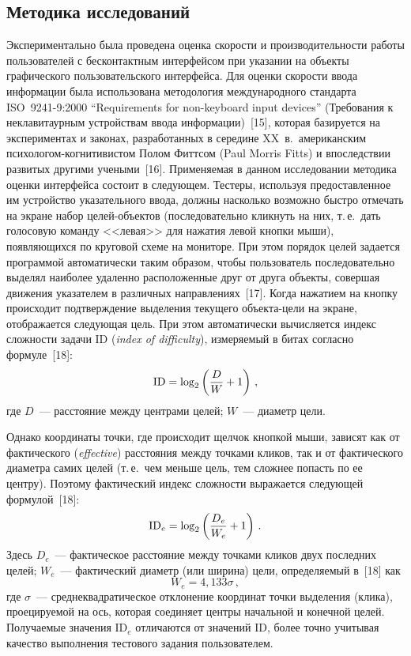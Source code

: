 \begin{multicols}{2}
\subsection{Методика исследований}

  Экспериментально была проведена оценка скорости и производительности 
работы пользователей с бесконтактным интерфейсом при указании на объекты 
графического пользовательского интерфейса. Для оценки скорости ввода 
информации была использована методология международного стандарта 
ISO~9241-9:2000 ``Requirements for non-keyboard input devices'' (Требования 
к неклавитаурным устройствам ввода информации)~[15], которая базируется на 
экспериментах и законах, разработанных в середине XX~в.\ американским 
пси\-хо\-ло\-гом-когни\-ти\-ви\-стом Полом Фиттсом (Paul Morris Fitts) и впоследствии 
развитых другими учеными~[16]. Применяемая в данном исследовании 
методика оценки интерфейса состоит в следующем. Тестеры, используя 
предоставленное им устройство указательного ввода, должны насколько 
возможно быстро отмечать на экране набор целей-объектов (последовательно 
кликнуть на них, т.\,е.\ дать голосовую команду <<левая>> для нажатия левой 
кнопки мыши), появляющихся по круговой схеме на мониторе. При этом 
порядок целей задается программой автоматически таким образом, чтобы 
пользователь последовательно выделял наиболее удаленно расположенные 
друг от друга объекты, совершая движения указателем в различных 
направлениях~[17]. Когда нажатием на кнопку происходит подтверждение 
выделения текущего объекта-цели на экране, отображается следующая цель. 
При этом автоматически вычисляется индекс сложности задачи ID
(\textit{index of difficulty}), измеряемый в битах согласно формуле~[18]:
  \begin{equation}
\mathrm{ID}=\log_2 \left( \displaystyle\frac{\displaystyle D\mathstrut}{\displaystyle W\mathstrut}+1\right)\,,
  \label{e1kar}
  \end{equation}
где $D$~--- расстояние между центрами целей; $W$~--- диаметр цели. 
  
  Однако координаты точки, где происходит щелчок кнопкой мыши, зависят 
как от фактического (\textit{effective}) расстояния между точками кликов, так и 
от фактического диаметра самих целей (т.\,е.\ чем меньше цель, тем сложнее 
попасть по ее центру). Поэтому фактический индекс сложности выражается 
следующей формулой~[18]: 
  \begin{equation}
\mathrm{ID}_e=\log_2\left( \displaystyle\frac{\displaystyle D_e\mathstrut}{\displaystyle W_e\mathstrut}+1\right)\,.
  \label{e2kar}
  \end{equation}
Здесь $D_e$~--- фактическое расстояние между точками кликов двух последних 
целей; $W_e$~--- фактический диаметр (или ширина) цели, определяемый 
в~[18] как
\begin{equation}
W_e=4{,}133 \sigma\,,
\label{e3kar}
\end{equation}
где $\sigma$~--- среднеквадратическое отклонение координат точки выделения 
(клика), проецируемой на ось, которая соединяет центры начальной и конечной 
целей. Получаемые значения ID$_e$ отличаются от значений ID, более точно 
учитывая качество выполнения тестового задания пользователем.


\end{multicols}
